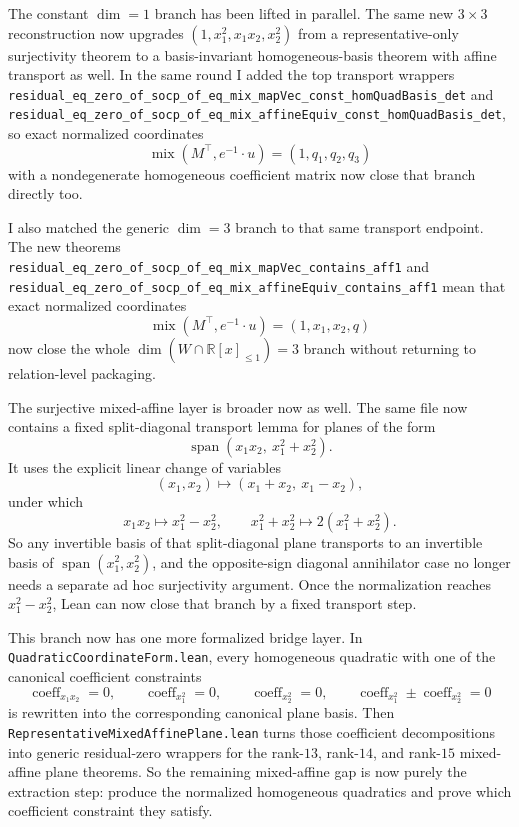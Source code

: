 \documentclass[11pt]{article}
\begin{document}
The constant \(\dim=1\) branch has been lifted in parallel. The same new
\(3\times 3\) reconstruction now upgrades
\((1,x_1^2,x_1x_2,x_2^2)\) from a representative-only surjectivity theorem to
a basis-invariant homogeneous-basis theorem with affine transport as well. In
the same round I added the top transport wrappers
\texttt{residual\_eq\_zero\_of\_socp\_of\_eq\_mix\_mapVec\_const\_homQuadBasis\_det}
and
\texttt{residual\_eq\_zero\_of\_socp\_of\_eq\_mix\_affineEquiv\_const\_homQuadBasis\_det},
so exact normalized coordinates
\[
  \operatorname{mix}(M^\top,e^{-1}\!\cdot u)=(1,q_1,q_2,q_3)
\]
with a nondegenerate homogeneous coefficient matrix now close that branch
directly too.

I also matched the generic \(\dim=3\) branch to that same transport endpoint.
The new theorems
\texttt{residual\_eq\_zero\_of\_socp\_of\_eq\_mix\_mapVec\_contains\_aff1} and
\texttt{residual\_eq\_zero\_of\_socp\_of\_eq\_mix\_affineEquiv\_contains\_aff1}
mean that exact normalized coordinates
\[
  \operatorname{mix}(M^\top,e^{-1}\!\cdot u)=(1,x_1,x_2,q)
\]
now close the whole \(\dim(W \cap \mathbb{R}[x]_{\le 1})=3\) branch without
returning to relation-level packaging.

The surjective mixed-affine layer is broader now as well. The same file now
contains a fixed split-diagonal transport lemma for planes of the form
\[
  \operatorname{span}(x_1x_2,\ x_1^2+x_2^2).
\]
It uses the explicit linear change of variables
\[
  (x_1,x_2)\mapsto(x_1+x_2,\ x_1-x_2),
\]
under which
\[
  x_1x_2 \mapsto x_1^2-x_2^2,
  \qquad
  x_1^2+x_2^2 \mapsto 2(x_1^2+x_2^2).
\]
So any invertible basis of that split-diagonal plane transports to an
invertible basis of \(\operatorname{span}(x_1^2,x_2^2)\), and the opposite-sign
diagonal annihilator case no longer needs a separate ad hoc surjectivity
argument. Once the normalization reaches \(x_1^2-x_2^2\), Lean can now close
that branch by a fixed transport step.

This branch now has one more formalized bridge layer. In
\texttt{QuadraticCoordinateForm.lean}, every homogeneous quadratic with one of
the canonical coefficient constraints
\[
  \operatorname{coeff}_{x_1x_2}=0,\qquad
  \operatorname{coeff}_{x_1^2}=0,\qquad
  \operatorname{coeff}_{x_2^2}=0,\qquad
  \operatorname{coeff}_{x_1^2}\pm \operatorname{coeff}_{x_2^2}=0
\]
is rewritten into the corresponding canonical plane basis. Then
\texttt{RepresentativeMixedAffinePlane.lean} turns those coefficient
decompositions into generic residual-zero wrappers for the rank-$13$,
rank-$14$, and rank-$15$ mixed-affine plane theorems. So the remaining
mixed-affine gap is now purely the extraction step: produce the normalized
homogeneous quadratics and prove which coefficient constraint they satisfy.
\end{document}
